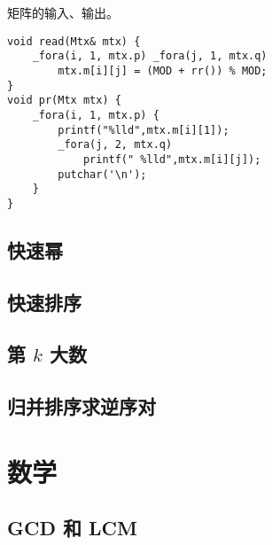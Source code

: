 \documentclass{probook}
\begin{document}
\begin{multicols}{2}


矩阵的输入、输出。

\begin{lstlisting}[style=cpp]
void read(Mtx& mtx) {
    _fora(i, 1, mtx.p) _fora(j, 1, mtx.q)
        mtx.m[i][j] = (MOD + rr()) % MOD;
}
void pr(Mtx mtx) {
    _fora(i, 1, mtx.p) {
        printf("%lld",mtx.m[i][1]);
        _fora(j, 2, mtx.q)
            printf(" %lld",mtx.m[i][j]);
        putchar('\n');
    }
}
\end{lstlisting}

\section{快速幂}





\section{快速排序}



\section{\texorpdfstring{第 $k$ 大数}{第 k 大数}}



\section{归并排序求逆序对}









\chapter{数学}

\section{GCD 和 LCM}


\end{multicols}
\end{document}
